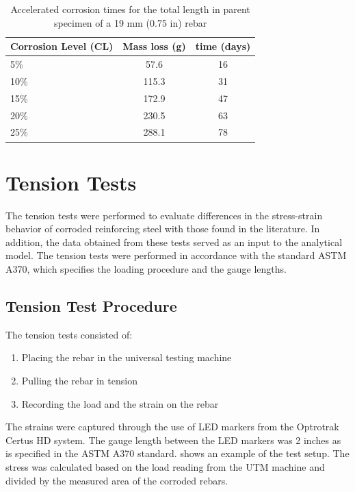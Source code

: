 \begin{table}[htbp]
	\caption{Accelerated corrosion times for the total length in parent specimen of a 19 mm (0.75 in) rebar}
	\label{tab:AcceleratedCorrosionTime}
	\centering	
		\begin{tabular}{l c c}
		Corrosion Level (CL) & Mass loss (g)   & time (days)     \\  \hline	
		5\%                  & 57.6            & 16    \\	
		10\%                 & 115.3            & 31     \\	
		15\%                 & 172.9            & 47   \\	
		20\%                 & 230.5            & 63     \\
		25\%                 & 288.1               & 78   \\
		\end{tabular}
\end{table}

\section{Tension Tests}

The tension tests were performed to evaluate differences in the stress-strain behavior of corroded reinforcing steel with those found in the literature. In addition, the data obtained from these tests served as an input to the analytical model. The tension tests were performed in accordance with the standard ASTM A370, which specifies the loading procedure and the gauge lengths. 
\subsection{Tension Test Procedure}

The tension tests consisted of:
\begin{enumerate}
    \item Placing the rebar in the universal testing machine
    \item Pulling the rebar in tension 
    \item Recording the load and the strain on the rebar 
\end{enumerate}

The strains were captured through the use of LED markers from the Optrotrak Certus HD system. The gauge length between the LED markers was 2 inches as is specified in the ASTM A370 standard.  shows an example of the test setup. The stress was calculated based on the load reading from the UTM machine and divided by the measured area of the corroded rebars.

